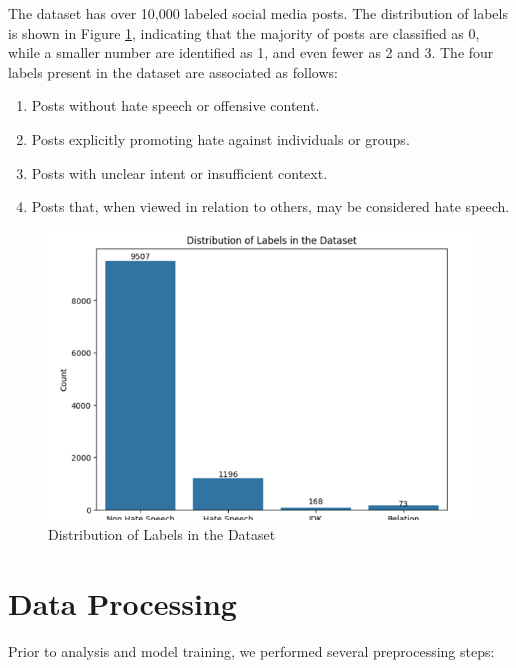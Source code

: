 \documentclass{article}
\begin{document}
The dataset has over 10,000 labeled social media posts. The distribution of labels is shown in Figure \ref{fig:label_distribution}, indicating that the majority of posts are classified as 0, while a smaller number are identified as 1, and even fewer as 2 and 3. The four labels present in the dataset are associated as follows:
\begin{enumerate}
    \item[0] Posts without hate speech or offensive content.
    \item[1] Posts explicitly promoting hate against individuals or groups.
    \item[2] Posts with unclear intent or insufficient context.
    \item[3] Posts that, when viewed in relation to others, may be considered hate speech.
\end{enumerate}


\begin{figure}[H]
    \centering
    \includegraphics[width=\linewidth]{figure2.png}
    \caption{Distribution of Labels in the Dataset}
     \label{fig:label_distribution}
\end{figure}

\section*{Data Processing}

Prior to analysis and model training, we performed several preprocessing steps:
\end{document}
